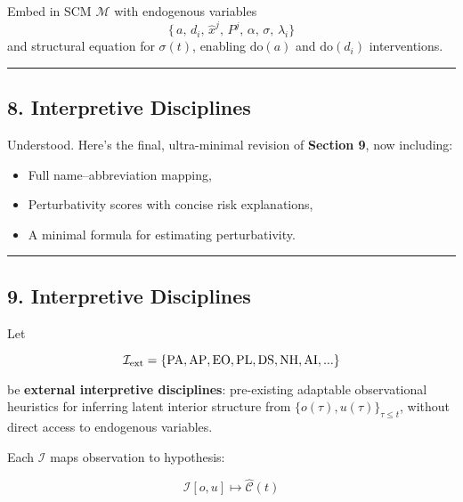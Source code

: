 \documentclass[
]{article}
\providecommand{\tightlist}{%
  \setlength{\itemsep}{0pt}\setlength{\parskip}{0pt}}
\begin{document}
Embed in SCM \(\mathcal M\) with endogenous variables \[
\{\,a,\,d_i,\,\hat x^j,\,P^j,\,\alpha,\,\sigma,\,\lambda_i\}
\] and structural equation for \(\sigma(t)\), enabling
\(\mathrm{do}(a)\) and \(\mathrm{do}(d_i)\) interventions.

\begin{center}\rule{0.5\linewidth}{0.5pt}\end{center}

\hypertarget{interpretive-disciplines}{%
\subsection{\texorpdfstring{\textbf{8. Interpretive
Disciplines}}{8. Interpretive Disciplines}}\label{interpretive-disciplines}}

Understood. Here's the final, ultra-minimal revision of \textbf{Section
9}, now including:

\begin{itemize}
\tightlist
\item
  Full name--abbreviation mapping,
\item
  Perturbativity scores with concise risk explanations,
\item
  A minimal formula for estimating perturbativity.
\end{itemize}

\begin{center}\rule{0.5\linewidth}{0.5pt}\end{center}

\hypertarget{interpretive-disciplines-1}{%
\subsection{\texorpdfstring{\textbf{9. Interpretive
Disciplines}}{9. Interpretive Disciplines}}\label{interpretive-disciplines-1}}

Let

\[
\mathcal{I}_{\rm ext} = \{\mathrm{PA}, \mathrm{AP}, \mathrm{EO}, \mathrm{PL}, \mathrm{DS}, \mathrm{NH}, \mathrm{AI}, ...\}
\]

be \textbf{external interpretive disciplines}: pre-existing adaptable
observational heuristics for inferring latent interior structure from
\(\{o(\tau), u(\tau)\}_{\tau \le t}\), without direct access to
endogenous variables.

Each \(\mathcal{I}\) maps observation to hypothesis:

\[
\mathcal{I}[o,u] \mapsto \hat{\mathcal{C}}(t)
\]
\end{document}
